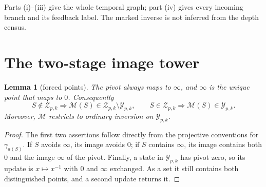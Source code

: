 \documentclass[a4paper,10pt]{amsart}
\newtheorem{lemma}[theorem]{Lemma}
\theoremstyle{remark}
\newcommand{\Y}{\mathcal Y}
\newcommand{\Z}{\mathcal Z}
\newcommand{\M}{\mathcal M}
\begin{document}
Parts (i)--(iii) give the whole temporal graph; part (iv) gives every
incoming branch and its feedback label.  The marked inverse is not inferred
from the depth census.

\section{The two-stage image tower}

\begin{lemma}[forced points]\label{lem:tower}
The pivot always maps to $\infty$, and $\infty$ is the unique point that
maps to $0$.  Consequently
\[
 S\notin\Z_{p,k}\Longrightarrow
 \M(S)\in\Z_{p,k}\setminus\Y_{p,k},\qquad
 S\in\Z_{p,k}\Longrightarrow\M(S)\in\Y_{p,k}.
\]
Moreover, $\M$ restricts to ordinary inversion on $\Y_{p,k}$.
\end{lemma}

\begin{proof}
The first two assertions follow directly from the projective conventions for
$\gamma_{a(S)}$.  If $S$ avoids $\infty$, its image avoids $0$; if $S$
contains $\infty$, its image contains both $0$ and the image $\infty$ of the
pivot.  Finally, a state in $\Y_{p,k}$ has pivot zero, so its update is
$x\mapsto x^{-1}$ with $0$ and $\infty$ exchanged.  As a set it still
contains both distinguished points, and a second update returns it.
\end{proof}
\end{document}
